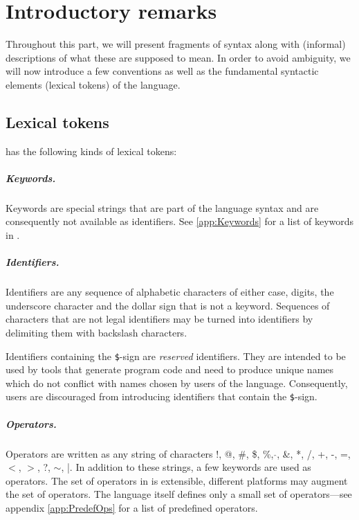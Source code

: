 
\chapter{Introductory remarks}\label{chap:SyntaxIntro}

Throughout this part, we will present fragments of \Cal syntax
along with (informal) descriptions of what these are supposed to
mean. In order to avoid ambiguity, we will now introduce a few
conventions as well as the fundamental syntactic elements (lexical
tokens) of the \Cal language.


\section{Lexical tokens}\label{sect:LexicalMatters}

  
\Cal
has the following kinds of lexical tokens:

\paragraph{Keywords.} Keywords are special strings that are part of
the language syntax and are consequently not available as
identifiers. See \ref{app:Keywords} for a list of keywords in \Cal.

\paragraph{Identifiers.} Identifiers are any sequence of alphabetic
characters of either case, digits, the underscore character and the
dollar sign that is not a keyword. Sequences of characters that are
not legal identifiers may be turned into identifiers by delimiting
them with backslash characters.

Identifiers containing the {\tt \$}-sign are {\em reserved}
identifiers. They are intended to be used by tools that generate
\Cal program code and need to produce unique names which do not
conflict with names chosen by users of the language. Consequently,
users are discouraged from introducing identifiers that contain the
{\tt \$}-sign.

\paragraph{Operators.} Operators are written as any string of
characters !, @, \#, \$, \%, $\hat{}$, \&, *, /, +, -, =, $<$, $>$, ?,
$\sim$, |. In addition to these strings, a few keywords are used as
operators. The set of operators in \Cal is extensible, different
platforms may augment the set of operators. The language itself
defines only a small set of operators---see appendix
\ref{app:PredefOps} for a list of predefined operators.

